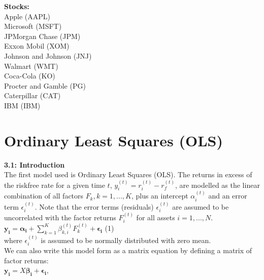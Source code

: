 \documentclass{article}
\begin{document}
\vspace{5mm}

\textbf{Stocks:}\\
Apple (AAPL)\\
Microsoft (MSFT)\\
JPMorgan Chase (JPM)\\
Exxon Mobil (XOM)\\
Johnson and Johnson (JNJ)\\
Walmart (WMT)\\
Coca-Cola (KO)\\
Procter and Gamble (PG)\\
Caterpillar (CAT)\\
IBM (IBM)\\


\break



\section{Ordinary Least Squares (OLS)}

\textbf{3.1: Introduction}\\

The first model used is Ordinary Least Squares (OLS). The returns in excess of the riskfree rate for a given time $t$, $y_i^{(t)} = r_i^{(t)} - r_f^{(t)}$, are modelled as the linear combination of all factors $F_k, k=1,...,K$, plus an intercept $\alpha_i^{(t)}$ and an error term $\epsilon_i^{(t)}$. Note that the error terms (residuals) $\epsilon_i^{(t)}$ are assumed to be uncorrelated with the factor returns $F_i^{(t)}$ for all assets $i = 1,...,N$.\\

$\bm{y_i} = \bm{\alpha_i} + \sum_{k=1}^K \beta_{k,i}^{(t)} F^{(t)}_k + \bm{\epsilon_i}$ \hfill (1)\\

where $\epsilon_i^{(t)}$ is assumed to be normally distributed with zero mean. \\

We can also write this model form as a matrix equation by defining a matrix of factor returns:\\

$\bm{y_i} = X\bm{\beta_i} + \bm{\epsilon_i},$\\
\end{document}
